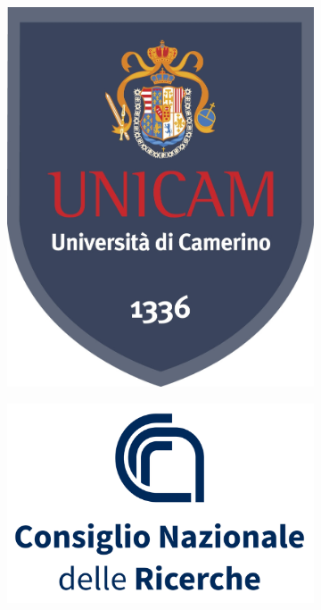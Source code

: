\documentclass[11pt,oneside]{amsart}
\begin{document}
\begin{titlepage}
\begin{center}
\vspace{.3 cm}
%
\begin{figure}[htpb]
    \centering
    \begin{subfigure}{.2\textwidth}
        \centering
        \includegraphics[scale=.2]{unicam.jpg}
    \end{subfigure}%
    \begin{subfigure}{.2\textwidth}
        \centering
        \includegraphics[scale=.2]{Consiglio_Nazionale_delle_Ricerche_logo_verticale.png}
    \end{subfigure}
\end{figure}
%
\vspace{.3 cm}


\end{center}
\end{titlepage}
\end{document}
